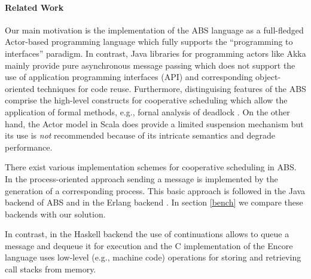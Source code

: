 \paragraph{Related Work}

Our main motivation is  the  implementation of the ABS language  as a full-fledged Actor-based programming language which fully supports   the ``programming to interfaces'' paradigm.
In contrast,  Java libraries for programming actors like Akka  \cite{Akka} mainly  provide  pure asynchronous  message passing which does not  support the use of application programming interfaces (API) and corresponding object-oriented techniques for code reuse.
Furthermore,  distinguising features of the ABS comprise the high-level constructs for cooperative scheduling which allow the application of formal methods, e.g.,
fornal analysis of deadlock \cite{deadlock}.
On the other hand,  the Actor model in Scala \cite{Scala} does provide a limited suspension mechanism but its use is \emph{not} recommended because of its intricate semantics and degrade performance.

There exist various implementation schemes for cooperative scheduling in ABS.
In the process-oriented approach sending a message  is implemented by the generation of a  corresponding process. This basic approach is followed in the Java backend of ABS \cite{abs,Schafer} and in the Erlang backend \cite{Erlang}.
In section \ref{bench} we compare these backends with our solution.


In contrast, in the Haskell backend \cite{Haskell}  the use of continuations allows
to queue  a message and dequeue it for execution and the C implementation of the
Encore language \cite{Encore}  uses low-level (e.g., machine code) operations for
storing and retrieving call stacks from memory.






